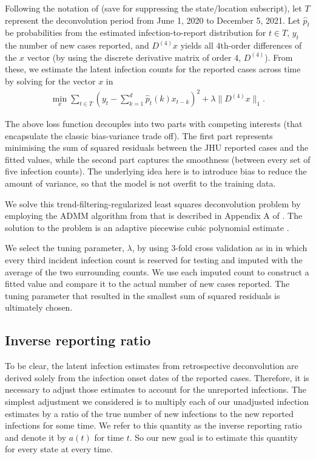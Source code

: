 \documentclass{article}
\begin{document}
Following the notation of \citet{jahja2022real} (save for suppressing the state/location subscript), let $T$ represent the deconvolution period from June 1, 2020 to December 5, 2021. Let $\hat{p}_t$ be probabilities from the estimated infection-to-report distribution for $t \in T$, $y_t$ the number of new cases reported, and $D^{(4)}x$ yields all $4$th-order differences of the $x$ vector (by using the discrete derivative matrix of order $4$, $D^{(4)}$). From these, we estimate the latent infection counts for the reported cases across time by solving for the vector $x$ in
\begin{align*}
\min_{x} \sum_{t \in T} \left ( y_t -  \sum_{k = 1}^{d} \hat{p}_t(k)x_{t-k} \right )^2 + \lambda \|D^{(4)}x\|_1. 
\end{align*}

The above loss function decouples into two parts with competing interests (that encapsulate the classic bias-variance trade off). The first part represents minimising the sum of squared residuals between the JHU reported cases and the fitted values, while the second part captures the smoothness (between every set of five infection counts). The underlying idea here is to introduce bias to reduce the amount of variance, so that the model is not overfit to the training data.

We solve this trend-filtering-regularized least squares deconvolution problem by employing the ADMM algorithm from \citet{ramdas2016fast} that is described in Appendix A of \citet{jahja2022real}. The solution to the problem is an adaptive piecewise cubic polynomial estimate \citep{tibshirani2014adaptive, tibshirani2022divided}.

We select the tuning parameter, $\lambda$, by using $3$-fold cross validation as in \citet{jahja2022real} in which every third incident infection count is reserved for testing and imputed with the average of the two surrounding counts. We use each imputed count to construct a fitted value and compare it to the actual number of new cases reported. The tuning parameter that resulted in the smallest sum of squared residuals is ultimately chosen.

\subsection{Inverse reporting ratio} To be clear, the latent infection estimates from retrospective deconvolution are derived solely from the infection onset dates of the reported cases. Therefore, it is necessary to adjust those estimates to account for the unreported infections. The simplest adjustment we considered is to multiply each of our unadjusted infection estimates by a ratio of the true number of new infections to the new reported infections for some time. We refer to this quantity as the inverse reporting ratio and denote it by $a(t)$ for time $t$. So our new goal is to estimate this quantity for every state at every time. 
\end{document}
